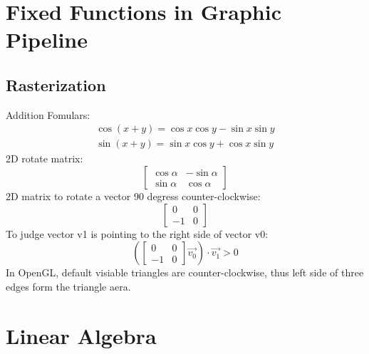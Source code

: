 \documentclass[12pt]{article}
\begin{document}
\sffamily
\section{Fixed Functions in Graphic Pipeline}
    \subsection{Rasterization}
    Addition Fomulars:
    \[ \begin{array}{c}
        \cos{ \left( x+y \right) }=\cos{x}\cos{y}-\sin{x}\sin{y} \\
        \sin{ \left( x+y \right) }=\sin{x}\cos{y}+\cos{x}\sin{y}
    \end{array} \]
    2D rotate matrix:
    \[ \left[ \begin{array}{rr}
        \cos{\alpha} & -\sin{\alpha} \\
        \sin{\alpha} & \cos{\alpha}
    \end{array} \right] \]
    2D matrix to rotate a vector 90 degress counter-clockwise:
    \[ \left[ \begin{array}{rr}
        0 & 0\\
        -1 & 0
    \end{array} \right] \]
    To judge vector v1 is pointing to the right side of vector v0:
    \[
    \left(
        \left[ \begin{array}{rr} 0 & 0\\ -1 & 0 \end{array} \right]
        \overrightarrow{v_0}
    \right)
    \cdot \overrightarrow{v_1} > 0
    \]
    In OpenGL, default visiable triangles are counter-clockwise, thus left side of 
    three edges form the triangle aera.
\section{Linear Algebra}
\end{document}
